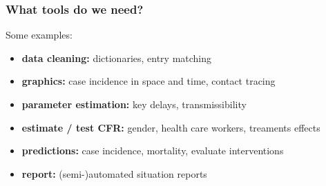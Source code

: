 \documentclass[xcolor=svgnames,mathserif]{beamer}
\begin{document}





\begin{frame}[fragile]
  \frametitle{What tools do we need?}

  Some examples: 
  
  \begin{itemize}
   \item \textbf{data cleaning:} dictionaries, entry matching
   \vspace{.3cm}
   \item \textbf{graphics:} case incidence in space and time, contact tracing
   \vspace{.3cm}
   \item \textbf{parameter estimation:} key delays, transmissibility
   \vspace{.3cm}
   \item \textbf{estimate / test CFR:} gender, health care workers, treaments effects
   \vspace{.3cm}
   \item \textbf{predictions:} case incidence, mortality, evaluate interventions
   \vspace{.3cm}
   \item \textbf{report:} (semi-)automated situation reports
  \end{itemize}


\end{frame}
\end{document}
